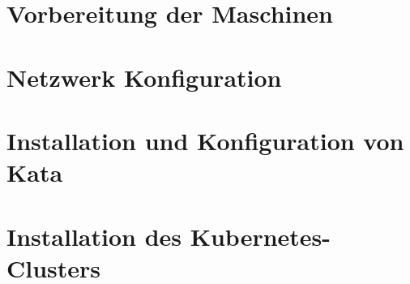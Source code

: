 \section{Vorbereitung der Maschinen}


\section{Netzwerk Konfiguration}

\section{Installation und Konfiguration von Kata}

\section{Installation des Kubernetes-Clusters}


